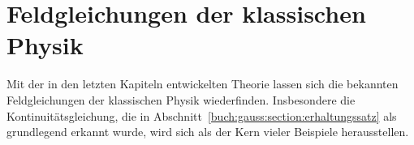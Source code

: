 %
%
%
\chapter{Feldgleichungen der klassischen Physik
\label{chapter:feldgleichungen}}

\noindent
Mit der in den letzten Kapiteln entwickelten Theorie lassen sich
die bekannten Feldgleichungen der klassischen Physik wiederfinden.
Insbesondere die Kontinuitätsgleichung, die in
Abschnitt~\ref{buch:gauss:section:erhaltungssatz}
als grundlegend erkannt wurde,
wird sich als der Kern vieler Beispiele herausstellen.






